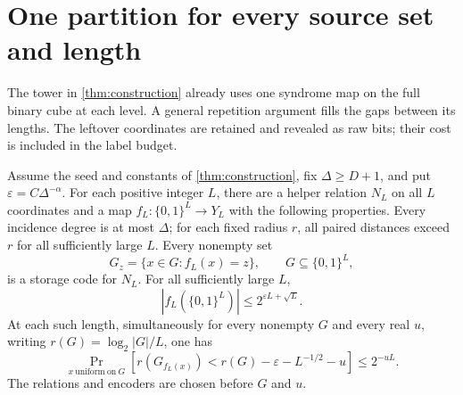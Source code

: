 \section{One partition for every source set and length}\label{sec:partitions}

The tower in \cref{thm:construction} already uses one syndrome map on
the full binary cube at each level. A general repetition argument fills
the gaps between its lengths. The leftover coordinates are retained and
revealed as raw bits; their cost is included in the label budget.

\begin{theorem}\label{thm:all-length}
Assume the seed and constants of \cref{thm:construction}, fix
$\Delta\ge D+1$, and put $\varepsilon=C\Delta^{-\alpha}$.
For each positive integer $L$, there are a helper relation $N_L$ on
all $L$ coordinates and a map $f_L:\{0,1\}^L\to Y_L$ with the
following properties. Every incidence degree is at most $\Delta$;
for each fixed radius $r$, all paired distances exceed $r$ for all
sufficiently large $L$. Every nonempty set
\[
 G_z=\{x\in G:f_L(x)=z\},\qquad G\subseteq\{0,1\}^L,
\]
is a storage code for $N_L$. For all sufficiently large $L$,
\begin{equation}\label{eq:all-length-labels}
 |f_L(\{0,1\}^L)|\le 2^{\varepsilon L+\sqrt L}.
\end{equation}
At each such length, simultaneously for every nonempty $G$ and every
real $u$, writing $r(G)=\log_2|G|/L$, one has
\begin{equation}\label{eq:all-length-tail}
 \Pr_{x\ \mathrm{uniform\ on}\ G}
 \left[r(G_{f_L(x)})<r(G)-\varepsilon-L^{-1/2}-u\right]
 \le 2^{-uL}.
\end{equation}
The relations and encoders are chosen before $G$ and $u$.
\end{theorem}
